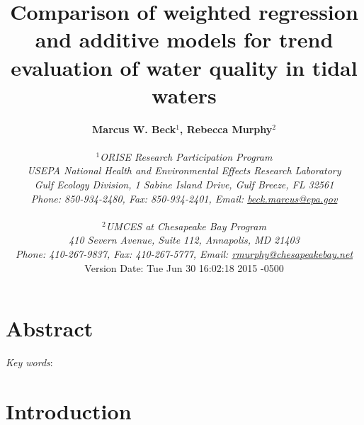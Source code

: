 \documentclass[letterpaper,12pt,oneside]{article}\usepackage[]{graphicx}\usepackage[]{color}
\begin{document}
\raggedbottom
\raggedright
{}
\setlength{\parindent}{0.5in}
\renewcommand\refname{References \vspace{12pt}}

\begin{singlespace}
\title{{\bf {\Large Comparison of weighted regression and additive models for trend evaluation of water quality in tidal waters}}}
\author{
  {\bf {\normalsize Marcus W. Beck$^1$, Rebecca Murphy$^2$}}
  \\\\{\textit {\normalsize $^1$ORISE Research Participation Program}}
  \\{\textit {\normalsize USEPA National Health and Environmental Effects Research Laboratory}}
  \\{\textit {\normalsize Gulf Ecology Division, 1 Sabine Island Drive, Gulf Breeze, FL 32561}}
	\\{\textit {\normalsize Phone: 850-934-2480, Fax: 850-934-2401, Email: \href{mailto:beck.marcus@epa.gov}{beck.marcus@epa.gov}}}
  \\\\{\textit {\normalsize $^2$UMCES at Chesapeake Bay Program}}
	\\{\textit {\normalsize 410 Severn Avenue, Suite 112, Annapolis, MD 21403}}
	\\{\textit {\normalsize Phone: 410-267-9837, Fax: 410-267-5777, Email: \href{mailto:rmurphy@chesapeakbay.net}{rmurphy@chesapeakebay.net}}}
  \vspace{1in} 
  \\ Version Date:   Tue Jun 30 16:02:18 2015 -0500
	}
\date{}
\maketitle
\end{singlespace}
\clearpage

\section*{Abstract}

\noindent \textit{Key words}:

\clearpage

\acresetall

\section{Introduction}
\end{document}
